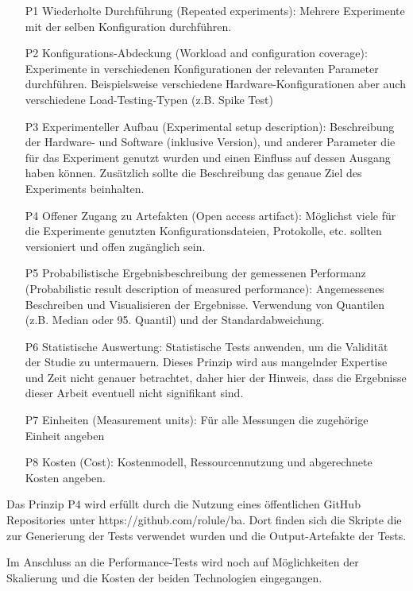 \begin{enumerate}
    \item[P1] Wiederholte Durchführung (Repeated experiments): Mehrere Experimente mit der selben Konfiguration durchführen. 
    \item[P2] Konfigurations-Abdeckung (Workload and configuration coverage): Experimente in verschiedenen Konfigurationen der relevanten Parameter durchführen. Beispielsweise verschiedene Hardware-Konfigurationen aber auch verschiedene Load-Testing-Typen (z.B. Spike Test)
    \item[P3] Experimenteller Aufbau (Experimental setup description): Beschreibung der Hardware- und Software (inklusive Version), und anderer Parameter die für das Experiment genutzt wurden und einen Einfluss auf dessen Ausgang haben können. Zusätzlich sollte die Beschreibung das genaue Ziel des Experiments beinhalten.
    \item[P4] Offener Zugang zu Artefakten (Open access artifact): Möglichst viele für die Experimente genutzten Konfigurationsdateien, Protokolle, etc. sollten versioniert und offen zugänglich sein.
    \item[P5] Probabilistische Ergebnisbeschreibung der gemessenen Performanz (Probabilistic result description of measured performance): Angemessenes Beschreiben und Visualisieren der Ergebnisse. Verwendung von Quantilen (z.B. Median oder 95. Quantil) und der Standardabweichung.
    \item[P6] Statistische Auswertung: Statistische Tests anwenden, um die Validität der Studie zu untermauern. Dieses Prinzip wird aus mangelnder Expertise und Zeit nicht genauer betrachtet, daher hier der Hinweis, dass die Ergebnisse dieser Arbeit eventuell nicht signifikant sind.
    \item[P7] Einheiten (Measurement units): Für alle Messungen die zugehörige Einheit angeben
    \item[P8] Kosten (Cost): Kostenmodell, Ressourcennutzung und abgerechnete Kosten angeben.
\end{enumerate}

Das Prinzip P4 wird erfüllt durch die Nutzung eines öffentlichen GitHub Repositories unter https://github.com/rolule/ba. Dort finden sich die Skripte die zur Generierung der Tests verwendet wurden und die Output-Artefakte der Tests.

Im Anschluss an die Performance-Tests wird noch auf Möglichkeiten der Skalierung und die Kosten der beiden Technologien eingegangen.

